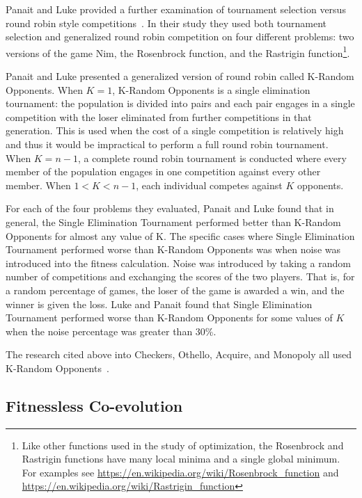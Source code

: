 Panait and Luke provided a further examination of tournament selection versus
round robin style competitions~\cite{Panait02acomparative}. In their study they
used both tournament selection and generalized round robin competition on four
different problems: two versions of the game Nim, the Rosenbrock function, and
the Rastrigin function\footnote{Like other functions used in the study of
optimization, the Rosenbrock and Rastrigin functions have many local minima and
a single global minimum. For examples see
\url{https://en.wikipedia.org/wiki/Rosenbrock_function} and
\url{https://en.wikipedia.org/wiki/Rastrigin_function}}.

Panait and Luke presented a generalized version of round robin called K-Random
Opponents. When \(K=1\), K-Random Opponents is a single elimination
tournament: the population is divided into pairs and each pair engages in a
single competition with the loser eliminated from further competitions in that
generation. This is used when the cost of a single competition is relatively
high and thus it would be impractical to perform a full round robin tournament.
When \(K=n-1\), a complete round robin tournament is conducted where every
member of the population engages in one competition against every other member.
When \(1 < K < n-1\), each individual competes against \(K\) opponents.

For each of the four problems they evaluated, Panait and Luke found that in
general, the Single Elimination Tournament performed better than K-Random
Opponents for almost any value of K. The specific cases where Single Elimination
Tournament performed worse than K-Random Opponents was when noise was introduced
into the fitness calculation. Noise was introduced by taking a random number of
competitions and exchanging the scores of the two players. That is, for a random
percentage of games, the loser of the game is awarded a win, and the winner is
given the loss. Luke and Panait found that Single Elimination Tournament
performed worse than K-Random Opponents for some values of \(K\) when the noise
percentage was greater than 30\%.

The research cited above into Checkers, Othello, Acquire, and Monopoly all used
K-Random
Opponents~\cite{Fogel2000Anaconda,journals/tec/ChellapillaF01,ChongTW05,Anthony2002,DBLP:conf/cig/Frayn05}.

\subsection{Fitnessless Co-evolution}


